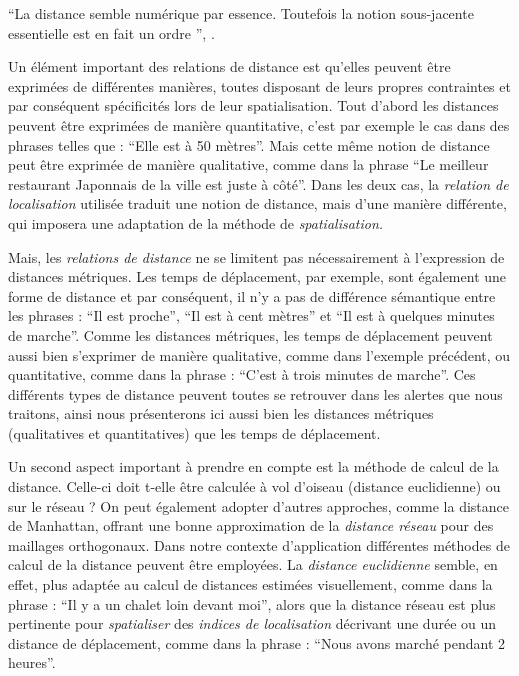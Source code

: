 \enquote{La distance \textelp{} semble \textelp{} numérique par
  essence. Toutefois \textelp{} la notion sous-jacente essentielle est
  en fait un ordre \textelp{}}, \textcite{Aurnague1997}.

Un élément important des relations de distance est qu'elles peuvent
être exprimées de différentes manières, toutes disposant de leurs
propres contraintes et par conséquent spécificités lors de leur
spatialisation. Tout d'abord les distances peuvent être exprimées de
manière quantitative, c'est par exemple le cas dans des phrases telles
que : \enquote{Elle est à 50 mètres}. Mais cette même notion de
distance peut être exprimée de manière qualitative, comme dans la
phrase \enquote{Le meilleur restaurant Japonnais de la ville est juste
  à côté}. Dans les deux cas, la \emph{relation de localisation}
utilisée traduit une notion de distance, mais d'une manière
différente, qui imposera une adaptation de la méthode de
\emph{spatialisation.}

Mais, les \emph{relations de distance} ne se limitent pas
nécessairement à l'expression de distances métriques. Les temps de
déplacement, par exemple, sont également une forme de distance et par
conséquent, il n'y a pas de différence sémantique entre les phrases :
\enquote{Il est proche}, \enquote{Il est à cent mètres} et \enquote{Il
  est à quelques minutes de marche}. Comme les distances métriques,
les temps de déplacement peuvent aussi bien s'exprimer de manière
qualitative, comme dans l'exemple précédent, ou quantitative, comme
dans la phrase : \enquote{C'est à trois minutes de marche}.  Ces
différents types de distance peuvent toutes se retrouver dans les
alertes que nous traitons, ainsi nous présenterons ici aussi bien les
distances métriques (qualitatives et quantitatives) que les temps de
déplacement.

Un second aspect important à prendre en compte est la méthode de
calcul de la distance. Celle-ci doit t-elle être calculée à vol
d'oiseau (\ie distance euclidienne) ou sur le réseau ? On peut
également adopter d'autres approches, comme la distance de Manhattan,
offrant une bonne approximation de la \emph{distance réseau} pour des
maillages orthogonaux. Dans notre contexte d’application différentes
méthodes de calcul de la distance peuvent être employées. La
\emph{distance euclidienne} semble, en effet, plus adaptée au calcul
de distances estimées visuellement, comme dans la phrase : \enquote{Il
  y a un chalet loin devant moi}, alors que la distance réseau est
plus pertinente pour \emph{spatialiser} des \emph{indices de
  localisation} décrivant une durée ou un distance de déplacement,
comme dans la phrase : \enquote{Nous avons marché pendant 2 heures}.

